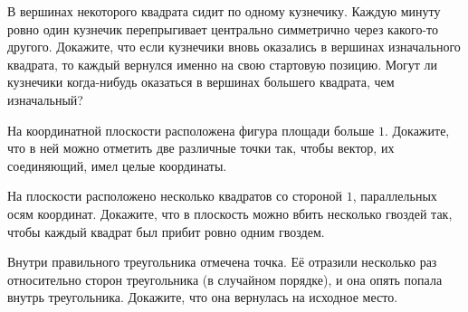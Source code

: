\resetproblem \begingroup %
    \def\jeolmdate{9 июня 2018 г., пара 2}%
    \def\jeolmgroupname{Группа 9-2}%
    \def\jeolmauthors{Афризонов Д., Кушнир А., Тихонов~Ю.}%
\jeolmheader \endgroup


\begin{problems}

\item В вершинах некоторого квадрата сидит по одному кузнечику. Каждую минуту ровно один кузнечик перепрыгивает центрально симметрично через какого-то другого. \subproblem Докажите, что если кузнечики вновь оказались в вершинах изначального квадрата, то каждый вернулся именно на свою стартовую позицию. \subproblem Могут ли кузнечики когда-нибудь оказаться в вершинах большего квадрата, чем изначальный?


\item На координатной плоскости расположена фигура площади больше $1$. Докажите, что в ней можно отметить две различные точки так, чтобы вектор, их соединяющий, имел целые координаты.

\item На плоскости расположено несколько квадратов со стороной $1$, параллельных осям координат. Докажите, что в плоскость можно вбить несколько гвоздей так, чтобы каждый квадрат был прибит ровно одним гвоздем.


\item Внутри правильного треугольника отмечена точка. Её отразили несколько раз относительно сторон треугольника (в случайном порядке), и она опять попала внутрь треугольника. Докажите, что она вернулась на исходное место.


\end{problems}
